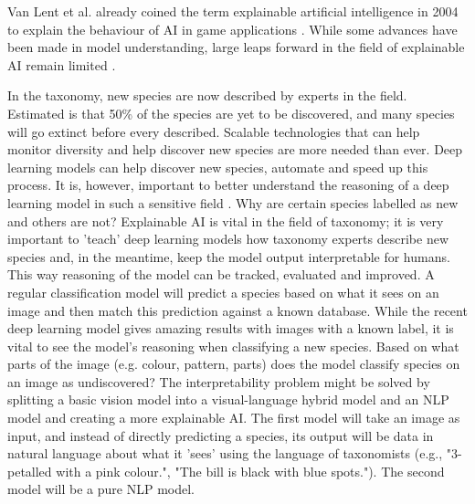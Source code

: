 \documentclass{article}
\begin{document}
Van Lent et al. already coined the term explainable artificial intelligence in 2004 to explain the behaviour of AI in game applications \cite{van_lent_explainable_2004}.
While some advances have been made in model understanding, large leaps forward in the field of explainable AI remain limited \cite{lipton_mythos_2017, li_interpretable_2021}.

In the taxonomy, new species are now described by experts in the field.
Estimated is that 50\% of the species are yet to be discovered, and many species will go extinct before every described.
Scalable technologies that can help monitor diversity and help discover new species are more needed than ever.
Deep learning models can help discover new species, automate and speed up this process.
It is, however, important to better understand the reasoning of a deep learning model in such a sensitive field \cite{carvalho_machine_2019}.
Why are certain species labelled as new and others are not?
Explainable AI is vital in the field of taxonomy; it is very important to 'teach' deep learning models how taxonomy experts describe new species and, in the meantime, keep the model output interpretable for humans.
This way reasoning of the model can be tracked, evaluated and improved.
A regular classification model will predict a species based on what it sees on an image and then match this prediction against a known database.
While the recent deep learning model gives amazing results with images with a known label, it is vital to see the model's reasoning when classifying a new species.
Based on what parts of the image (e.g. colour, pattern, parts) does the model classify species on an image as undiscovered?
The interpretability problem might be solved by splitting a basic vision model into a visual-language hybrid model and an NLP model and creating a more explainable AI.
The first model will take an image as input, and instead of directly predicting a species, its output will be data in natural language about what it 'sees' using the language of taxonomists (e.g., "3-petalled with a pink colour.", "The bill is black with blue spots.").
The second model will be a pure NLP model.
\end{document}
